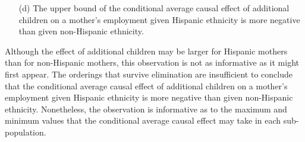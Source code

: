 \documentclass[12pt,a4paper,twoside]{article}
\numberwithin{equation}{section}
\begin{document}
\begin{enumerate}
\item[(d)] The upper bound of the conditional average causal effect of additional children on a mother's employment given Hispanic ethnicity is more negative than given non-Hispanic ethnicity. 
\end{enumerate}
Although the effect of additional children may be larger for Hispanic mothers than for non-Hispanic mothers, this observation is not as informative as it might first appear. The orderings that survive elimination are insufficient to conclude that the conditional average causal effect of additional children on a mother's employment given Hispanic ethnicity is more negative than given non-Hispanic ethnicity. Nonetheless, the observation is informative as to the maximum and minimum values that the conditional average causal effect may take in each sub-population.
\end{document}
